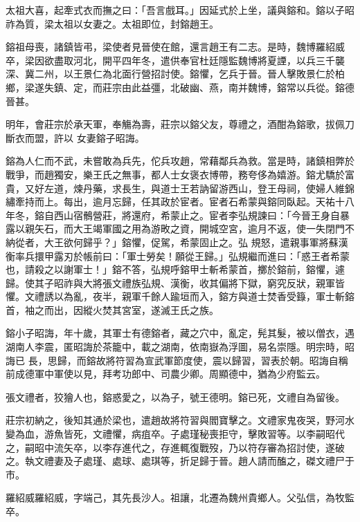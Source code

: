 \begin{pinyinscope}
 太祖大喜，起牽式衣而撫之曰：「吾言戲耳。」因延式於上坐，議與鎔和。鎔以子昭祚為質，梁太祖以女妻之。太祖即位，封鎔趙王。



 鎔祖母喪，諸鎮皆弔，梁使者見晉使在館，還言趙王有二志。是時，魏博羅紹威卒，梁因欲盡取河北，開平四年冬，遣供奉官杜廷隱監魏博將夏諲，以兵三千襲深、冀二州，以王景仁為北面行營招討使。鎔懼，乞兵于晉。晉人擊敗景仁於柏鄉，梁遂失鎮、定，而莊宗由此益彊，北破幽、燕，南并魏博，鎔常以兵從。鎔德晉甚。



 明年，會莊宗於承天軍，奉觴為壽，莊宗以鎔父友，尊禮之，酒酣為鎔歌，拔佩刀斷衣而盟，許以
 女妻鎔子昭誨。



 鎔為人仁而不武，未嘗敢為兵先，佗兵攻趙，常藉鄰兵為救。當是時，諸鎮相弊於戰爭，而趙獨安，樂王氏之無事，都人士女褒衣博帶，務夸侈為嬉游。鎔尤驕於富貴，又好左道，煉丹藥，求長生，與道士王若訥留游西山，登王母祠，使婦人維錦繡牽持而上。每出，逾月忘歸，任其政於宦者。宦者石希蒙與鎔同臥起。天祐十八年冬，鎔自西山宿鶻營莊，將還府，希蒙止之。宦者李弘規諫曰：「今晉王身自暴露以親矢石，而大王竭軍國之用為游畋之資，開城空宮，逾月不返，使一失閉門不納從者，大王欲何歸乎？」鎔懼，促駕，希蒙固止之。弘
 規怒，遣親事軍將蘇漢衡率兵擐甲露刃於帳前曰：「軍士勞矣！願從王歸。」弘規繼而進曰：「惑王者希蒙也，請殺之以謝軍士！」鎔不答，弘規呼鎔甲士斬希蒙首，擲於鎔前，鎔懼，遽歸。使其子昭祚與大將張文禮族弘規、漢衡，收其偏將下獄，窮究反狀，親軍皆懼。文禮誘以為亂，夜半，親軍千餘人踰垣而入，鎔方與道士焚香受籙，軍士斬鎔首，袖之而出，因縱火焚其宮室，遂滅王氏之族。



 鎔小子昭誨，年十歲，其軍士有德鎔者，藏之穴中，亂定，髡其髮，被以僧衣，遇湖南人李震，匿昭誨於茶籠中，載之湖南，依南嶽為浮圖，易名崇隱。明宗時，昭誨已
 長，思歸，而鎔故將符習為宣武軍節度使，震以歸習，習表於朝。昭誨自稱前成德軍中軍使以見，拜考功郎中、司農少卿。周顯德中，猶為少府監云。



 張文禮者，狡獪人也，鎔惑愛之，以為子，號王德明。鎔已死，文禮自為留後。



 莊宗初納之，後知其通於梁也，遣趙故將符習與閻寶擊之。文禮家鬼夜哭，野河水變為血，游魚皆死，文禮懼，病疽卒。子處瑾秘喪拒守，擊敗習等。以李嗣昭代之，嗣昭中流矢卒，以李存進代之，存進輒復戰歿，乃以符存審為招討使，遂破之。執文禮妻及子處瑾、處球、處琪等，折足歸于晉。趙人請而醢之，磔文禮尸于市。



 羅紹威羅紹威，字端己，其先長沙人。祖讓，北遷為魏州貴鄉人。父弘信，為牧監卒。




\end{pinyinscope}
